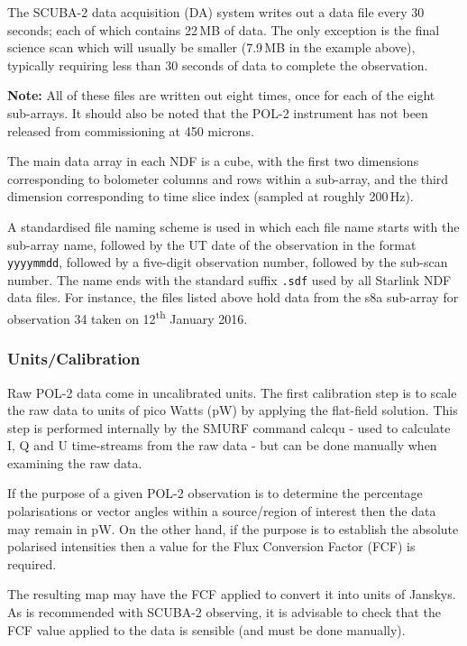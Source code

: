 The SCUBA-2 data acquisition (DA) system writes out a data file every
30 seconds; each of which contains 22\,MB of data. The only exception
is the final science scan which will usually be smaller (7.9\,MB in
the example above), typically requiring less than 30 seconds of data
to complete the observation.

\textbf{Note:} All of these files are written out eight times, once
for each of the eight sub-arrays. It should also be noted that the
POL-2 instrument has not been released from commissioning at 450
microns.

The main data array in each NDF is a cube, with the first two
dimensions corresponding to bolometer columns and rows within a
sub-array, and the third dimension corresponding to time slice index
(sampled at roughly 200\,Hz).

A standardised file naming scheme is used in which each file name
starts with the sub-array name, followed by the UT date of the
observation in the format \texttt{yyyymmdd}, followed by a five-digit
observation number, followed by the sub-scan number. The name ends
with the standard suffix \texttt{.sdf} used by all Starlink NDF data
files. For instance, the files listed above hold data from the s8a
sub-array for observation 34 taken on 12\textsuperscript{th} January
2016.




\subsubsection*{Units/Calibration}

Raw POL-2 data come in uncalibrated units. The first calibration step
is to scale the raw data to units of pico Watts (pW) by applying the
flat-field solution. This step is performed internally by the SMURF
command calcqu - used to calculate I, Q and U time-streams from the
raw data - but can be done manually when examining the raw data.

If the purpose of a given POL-2 observation is to determine the
percentage polarisations or vector angles within a source/region of
interest then the data may remain in pW. On the other hand, if the
purpose is to establish the absolute polarised intensities then a
value for the Flux Conversion Factor (FCF) is required.

The resulting map may have the FCF applied to convert it into units of
Janskys. As is recommended with SCUBA-2 observing, it is advisable to
check that the FCF value applied to the data is sensible (and must be
done manually).





